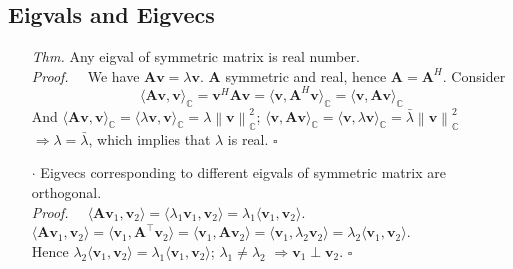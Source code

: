 \documentclass[a4paper, 11pt]{article}
\begin{document}
\subsection{Eigvals and Eigvecs}
\begin{itemize}
	\item[\textit{Thm.}] Any eigval of symmetric matrix is real number. \\
	\textit{Proof.~~} We have $\bm{Av} = \lambda \bm{v}$. $\bm{A}$ symmetric and real, hence $\bm{A}=\bm{A}^H$. Consider
	$$
	\langle \bm{Av}, \bm{v} \rangle_{\mathbb{C}} = \bm{v}^{H} \bm{Av}
	= \langle \bm{v}, \bm{A}^H \bm{v} \rangle_{\mathbb{C}} = \langle \bm{v}, \bm{Av} \rangle_{\mathbb{C}}
	$$
	And $\langle \bm{Av}, \bm{v} \rangle_{\mathbb{C}} = \langle \lambda\bm{v}, \bm{v} \rangle_{\mathbb{C}} = \lambda \left\|\bm{v}\right\|_{\mathbb{C}}^2$; $\langle \bm{v}, \bm{Av} \rangle_{\mathbb{C}} = \langle \bm{v}, \lambda\bm{v} \rangle_{\mathbb{C}} = \bar{\lambda} \left\|\bm{v}\right\|_{\mathbb{C}}^2$ \\
	$\Rightarrow \lambda = \bar{\lambda}$, which implies that $\lambda$ is real. $\square$
	\item[$\cdot$] Eigvecs corresponding to different eigvals of symmetric matrix are orthogonal.\\
	\textit{Proof.~~} $\langle \bm{Av}_1, \bm{v}_2 \rangle = \langle \lambda_1 \bm{v}_1, \bm{v}_2 \rangle = \lambda_1 \langle \bm{v}_1, \bm{v}_2 \rangle$.\\
	$\langle \bm{Av}_1, \bm{v}_2 \rangle = \langle \bm{v}_1, \bm{A}^{\top}\bm{v}_2 \rangle = \langle \bm{v}_1, \bm{A}\bm{v}_2 \rangle = \langle \bm{v}_1, \lambda_2\bm{v}_2 \rangle = \lambda_2 \langle \bm{v}_1, \bm{v}_2 \rangle$. \\
	Hence $\lambda_2 \langle \bm{v}_1, \bm{v}_2 \rangle = \lambda_1 \langle \bm{v}_1, \bm{v}_2 \rangle$; $\lambda_1 \ne \lambda_2$ $\Rightarrow \bm{v}_1 \perp \bm{v}_2$. $\square$
\end{itemize}
\end{document}
